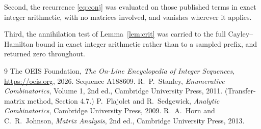 \documentclass[11pt,a4paper]{article}
\theoremstyle{plain}
\theoremstyle{definition}
\begin{document}
Second, the recurrence \eqref{eq:conj} was evaluated on those published terms in exact
integer arithmetic, with no matrices involved, and vanishes wherever it applies.

Third, the annihilation test of Lemma~\ref{lem:crit} was carried to the full
Cayley--Hamilton bound in exact integer arithmetic rather than to a sampled prefix, and
returned zero throughout.

\begin{thebibliography}{9}
 The OEIS Foundation, \emph{The On-Line Encyclopedia of Integer
Sequences}, \url{https://oeis.org}, 2026. Sequence A188609.
 R.~P.~Stanley, \emph{Enumerative Combinatorics}, Volume 1, 2nd ed.,
Cambridge University Press, 2011. (Transfer-matrix method, Section 4.7.)
 P.~Flajolet and R.~Sedgewick, \emph{Analytic Combinatorics}, Cambridge
University Press, 2009.
 R.~A.~Horn and C.~R.~Johnson, \emph{Matrix Analysis}, 2nd ed., Cambridge
University Press, 2013.
\end{thebibliography}
\end{document}
